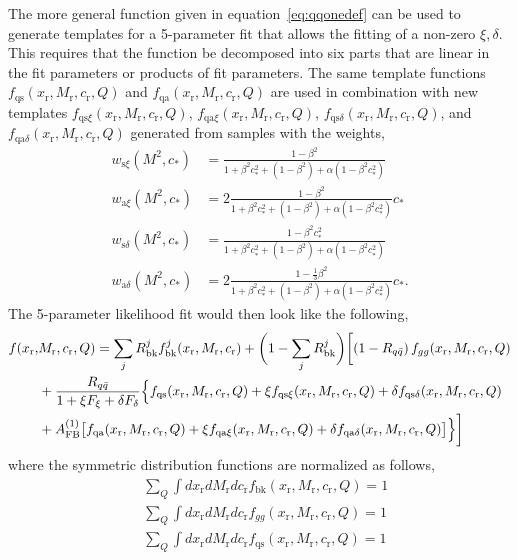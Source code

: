 \documentclass{cmspaperpdf}
\begin{document}
The more general function given in equation~\ref{eq:qqonedef} can be used to generate templates for a 5-parameter fit that allows the fitting of a non-zero $\xi,\delta$.  This requires that the function be decomposed into six parts that are linear in the fit parameters or products of fit parameters.  The same template functions $f_\mathrm{qs}(x_\mathrm{r}, M_\mathrm{r}, c_\mathrm{r},Q)$ and $f_\mathrm{qa}(x_\mathrm{r}, M_\mathrm{r}, c_\mathrm{r},Q)$ are used in combination with new templates $f_{\mathrm{qs}\xi}(x_\mathrm{r}, M_\mathrm{r}, c_\mathrm{r},Q)$, $f_{\mathrm{qa}\xi}(x_\mathrm{r}, M_\mathrm{r}, c_\mathrm{r},Q)$, $f_{\mathrm{qs}\delta}(x_\mathrm{r}, M_\mathrm{r}, c_\mathrm{r},Q)$, and $f_{\mathrm{qa}\delta}(x_\mathrm{r}, M_\mathrm{r}, c_\mathrm{r},Q)$ generated from samples with the weights,
\begin{align}
w_{\mathrm{s}\xi}(M^2, c_*) &= \frac{1-\beta^2}{1+\beta^2c_*^2+\left(1-\beta^2\right)+\alpha\left(1-\beta^2c_*^2\right)} \\
w_{\mathrm{a}\xi}(M^2, c_*) &= 2\frac{1-\beta^2}{1+\beta^2c_*^2+\left(1-\beta^2\right)+\alpha\left(1-\beta^2c_*^2\right)}c_*\\
w_{\mathrm{s}\delta}(M^2, c_*) &= \frac{1-\beta^2c_*^2}{1+\beta^2c_*^2+\left(1-\beta^2\right)+\alpha\left(1-\beta^2c_*^2\right)} \\
w_{\mathrm{a}\delta}(M^2, c_*) &= 2\frac{1-\frac{1}{3}\beta^2}{1+\beta^2c_*^2+\left(1-\beta^2\right)+\alpha\left(1-\beta^2c_*^2\right)}c_*.
\end{align}
The 5-parameter likelihood fit would then look like the following,
\begin{align}
f(x_\mathrm{r},&M_\mathrm{r},c_\mathrm{r},Q) =  \sum_jR^j_\mathrm{bk}f^j_\mathrm{bk}(x_\mathrm{r},M_\mathrm{r},c_\mathrm{r})+\biggl(1-\sum_jR^j_\mathrm{bk}\biggr )\biggl[ \left(1-R_{q\bar q}\right) f_{gg}(x_\mathrm{r},M_\mathrm{r},c_\mathrm{r},Q)\nonumber \\  \nonumber
&+\frac{R_{q\bar q}}{1+\xi F_{\xi}+\delta F_{\delta}}\Bigl\lbrace f_\mathrm{qs}(x_\mathrm{r}, M_\mathrm{r}, c_\mathrm{r},Q)+\xi f_{\mathrm{qs}\xi}(x_\mathrm{r}, M_\mathrm{r}, c_\mathrm{r},Q)+\delta f_{\mathrm{qs}\delta}(x_\mathrm{r}, M_\mathrm{r}, c_\mathrm{r},Q) \\
&+A_\mathrm{FB}^{(1)}\bigl[f_\mathrm{qa}(x_\mathrm{r}, M_\mathrm{r}, c_\mathrm{r},Q)+\xi f_{\mathrm{qa}\xi}(x_\mathrm{r}, M_\mathrm{r}, c_\mathrm{r},Q)+\delta f_{\mathrm{qa}\delta}(x_\mathrm{r}, M_\mathrm{r}, c_\mathrm{r},Q)\bigr]\Bigr\rbrace\biggr]   \label{eq:sixparone}
\end{align}
where the symmetric distribution functions are normalized as follows,
\begin{align}
 & \sum_{Q}\int dx_\mathrm{r} dM_\mathrm{r} dc_\mathrm{r} f_{\mathrm{bk}}(x_\mathrm{r}, M_\mathrm{r}, c_\mathrm{r},Q) = 1\\
 & \sum_{Q}\int dx_\mathrm{r} dM_\mathrm{r} dc_\mathrm{r} f_{gg}(x_\mathrm{r}, M_\mathrm{r}, c_\mathrm{r},Q) = 1\\
  & \sum_{Q}\int dx_\mathrm{r} dM_\mathrm{r} dc_\mathrm{r} f_{\mathrm{qs}}(x_\mathrm{r}, M_\mathrm{r}, c_\mathrm{r},Q) = 1
 \end{align}
\end{document}
